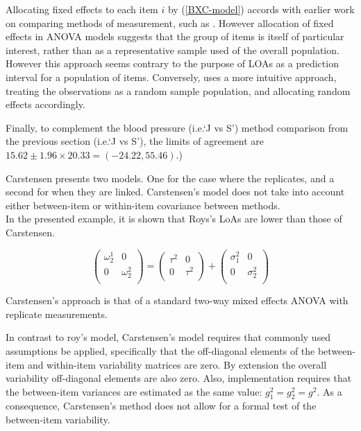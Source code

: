 \documentclass[12pt, a4paper]{report}
\theoremstyle{plain}
\theoremstyle{definition}
\theoremstyle{remark}
\begin{document}
	Allocating fixed effects to each item $i$ by (\ref{BXC-model}) accords with earlier work on comparing methods of measurement, such as \citet{Grubbs48}. However allocation of fixed effects in ANOVA models suggests that the group of items is itself of particular interest, rather than as a representative sample used of the overall population. However this approach seems contrary to the purpose of LOAs as a prediction interval for a population of items. Conversely, \citet{ARoy2009}
	uses a more intuitive approach, treating the observations as a random sample population, and allocating random effects accordingly.
	
	Finally, to complement the blood pressure (i.e.`J vs S') method comparison from the previous section (i.e.`J vs S'), the limits of agreement are $15.62 \pm 1.96 \times 20.33 = (-24.22, 55.46)$.)

Carstensen presents two models. One for the case where the replicates, and a second for when they are linked.
Carstensen's model does not take into account either between-item or within-item covariance between methods.\\
In the presented example, it is shown that Roys's LoAs are lower than those of Carstensen.




\[\left(\begin{array}{cc}
\omega^1_2  & 0 \\
0 & \omega^2_2 \\
\end{array}  \right)
=  \left(
\begin{array}{cc}
\tau^2  & 0 \\
0 & \tau^2 \\
\end{array} \right)+
\left(
\begin{array}{cc}
\sigma^2_1  & 0 \\
0 & \sigma^2_2 \\
\end{array}\right)
\]

	Carstensen's approach is that of a standard two-way mixed effects ANOVA with replicate measurements.
	
	In contrast to roy's model, Carstensen's model requires that commonly used assumptions be applied, specifically that the off-diagonal elements of the between-item and within-item variability matrices are zero. By
	extension the overall variability off-diagonal elements are also zero. 
	Also, implementation requires that the between-item variances are estimated as the same value: $g^2_1 = g^2_2 = g^2$.
	As a consequence, Carstensen's method does not allow for a formal test of the between-item variability.
\end{document}
